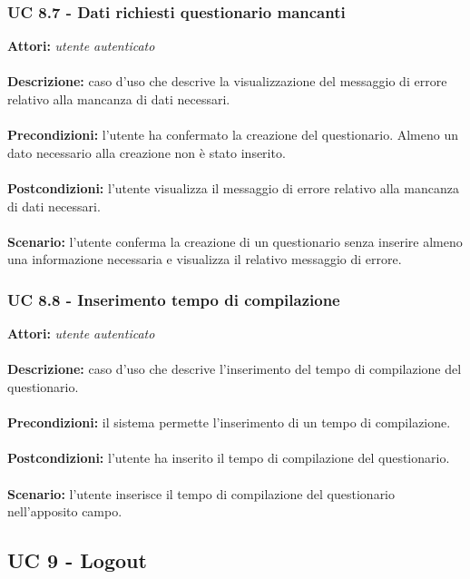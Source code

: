 \documentclass[a4paper,11pt]{article}
\begin{document}
\subsubsection{UC 8.7 - Dati richiesti questionario mancanti}

\textbf{Attori:} \textit{utente autenticato}
\\ \\
\textbf{Descrizione:} caso d'uso che descrive la visualizzazione del messaggio di errore relativo alla mancanza di dati necessari.\\
\\
\textbf{Precondizioni:} l'utente ha confermato la creazione del questionario. Almeno un dato necessario alla creazione non è stato inserito.\\
\\
\textbf{Postcondizioni:} l’utente visualizza il messaggio di errore relativo alla mancanza di dati necessari.\\
\\
\textbf{Scenario:} l'utente conferma la creazione di un questionario senza inserire almeno una informazione necessaria e visualizza il relativo messaggio di errore.\\


\subsubsection{UC 8.8 - Inserimento tempo di compilazione}

\textbf{Attori:} \textit{utente autenticato}
\\ \\
\textbf{Descrizione:} caso d'uso che descrive l'inserimento del tempo di compilazione del questionario.\\
\\
\textbf{Precondizioni:} il sistema permette l'inserimento di un tempo di compilazione.\\
\\
\textbf{Postcondizioni:} l’utente ha inserito il tempo di compilazione del questionario.\\
\\
\textbf{Scenario:} l'utente inserisce il tempo di compilazione del questionario nell'apposito campo.\\


\subsection{UC 9 - Logout}
\end{document}
